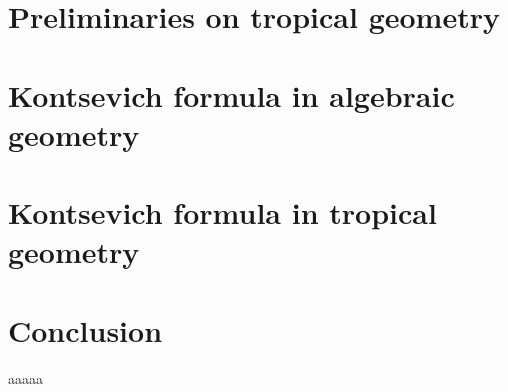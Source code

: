 \documentclass{iiser-thesis}
\theoremstyle{definition}
\theoremstyle{plain}
\begin{document}
\tableofcontents

\chapter{Preliminaries on tropical geometry}
\label{chap:sturmfels}


%

\chapter{Kontsevich formula in algebraic geometry}
\label{chap:kontalggeom}


\chapter{Kontsevich formula in tropical geometry}
\label{chap:kottropgeom}

\chapter{Conclusion}
\label{chap:conclusion}
aaaaa


\end{document}
